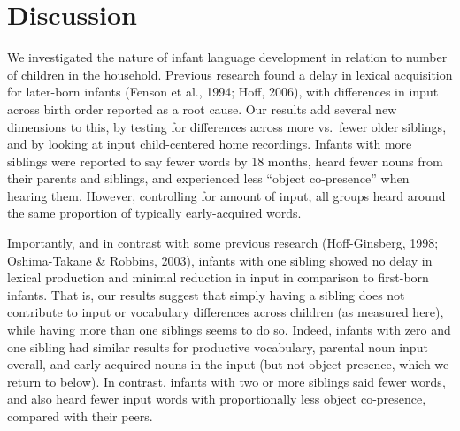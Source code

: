 \documentclass[
  english,
  man,floatsintext]{apa6}
\begin{document}
\hypertarget{discussion}{%
\section{Discussion}\label{discussion}}

We investigated the nature of infant language development in relation to number of children in the household. Previous research found a delay in lexical acquisition for later-born infants (Fenson et al., 1994; Hoff, 2006), with differences in input across birth order reported as a root cause. Our results add several new dimensions to this, by testing for differences across more vs.~fewer older siblings, and by looking at input child-centered home recordings. Infants with more siblings were reported to say fewer words by 18 months, heard fewer nouns from their parents and siblings, and experienced less \enquote{object co-presence} when hearing them. However, controlling for amount of input, all groups heard around the same proportion of typically early-acquired words.

Importantly, and in contrast with some previous research (Hoff-Ginsberg, 1998; Oshima-Takane \& Robbins, 2003), infants with one sibling showed no delay in lexical production and minimal reduction in input in comparison to first-born infants. That is, our results suggest that simply having a sibling does not contribute to input or vocabulary differences across children (as measured here), while having more than one siblings seems to do so. Indeed, infants with zero and one sibling had similar results for productive vocabulary, parental noun input overall, and early-acquired nouns in the input (but not object presence, which we return to below). In contrast, infants with two or more siblings said fewer words, and also heard fewer input words with proportionally less object co-presence, compared with their peers.
\end{document}
